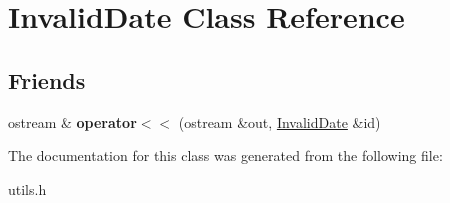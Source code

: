 \hypertarget{class_invalid_date}{}\section{Invalid\+Date Class Reference}
\label{class_invalid_date}
\subsection*{Friends}
\begin{DoxyCompactItemize}
\item 
\hypertarget{class_invalid_date_a9ef99a3039876284251a004f3727791c}{}\label{class_invalid_date_a9ef99a3039876284251a004f3727791c} 
ostream \& {\bfseries operator$<$$<$} (ostream \&out, \hyperlink{class_invalid_date}{Invalid\+Date} \&id)
\end{DoxyCompactItemize}


The documentation for this class was generated from the following file\+:\begin{DoxyCompactItemize}
\item 
utils.\+h\end{DoxyCompactItemize}
